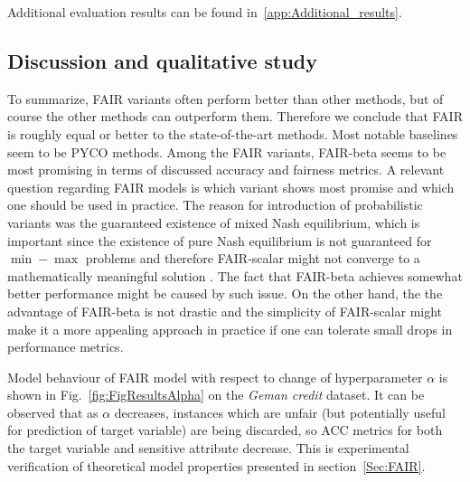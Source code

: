 \documentclass[preprint,12pt]{elsarticle}
\begin{document}
Additional evaluation results can be found in~\ref{app:Additional_results}.


\subsection{Discussion and qualitative study}

To summarize, FAIR variants often perform better than other methods, but of course the other methods can outperform them. Therefore we conclude that FAIR is roughly equal or better to the state-of-the-art methods. Most notable baselines seem to be PYCO methods. Among the FAIR variants, FAIR-beta seems to be most promising in terms of discussed accuracy and fairness metrics.
A relevant question regarding FAIR models is which variant shows most promise and which one should be used in practice. The reason for introduction of probabilistic variants was the guaranteed existence of mixed Nash equilibrium, which is important since the existence of pure Nash equilibrium is not guaranteed for $\min-\max$ problems and therefore FAIR-scalar might not converge to a mathematically meaningful solution \cite{tadelis2013game}. The fact that FAIR-beta achieves somewhat better performance might be caused by such issue. On the other hand, the the advantage of FAIR-beta is not drastic and the simplicity of FAIR-scalar might make it a more appealing approach in practice if one can tolerate small drops in performance metrics. 

Model behaviour of FAIR model with respect to change of hyperparameter $\alpha$ is shown in Fig.~\ref{fig:FigResultsAlpha} on the \textit{Geman credit} dataset. It can be observed that as $\alpha$ decreases, instances which are unfair (but potentially useful for prediction of target variable) are being discarded, so ACC metrics for both the target variable and sensitive attribute decrease. This is experimental verification of theoretical model properties presented in section~\ref{Sec:FAIR}.
\end{document}
